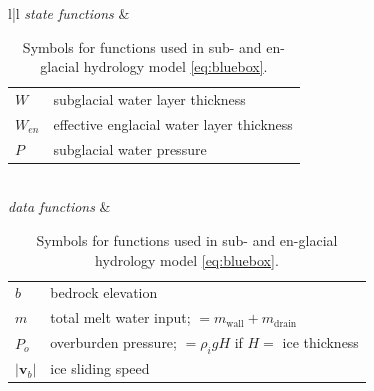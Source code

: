 \documentclass[11pt,final]{amsart}
\newcommand\bv{\mathbf{v}}
\begin{document}
\begin{table}[ht]
\caption{Symbols for functions used in sub- and en-glacial hydrology model \eqref{eq:bluebox}.}
\begin{tabular}{l|l}
\hline
\emph{state functions} & \begin{tabular}{ll}
        $W$ & subglacial water layer thickness \\
        $W_{en}$ & effective englacial water layer thickness \\
        $P$ & subglacial water pressure \\
        \end{tabular} \\ \hline
\emph{data functions} &  \begin{tabular}{ll}
        $b$ & bedrock elevation \\
        $m$ & total melt water input; $=m_{\text{wall}}+m_{\text{drain}}$ \\
        $P_o$ & overburden pressure; $= \rho_i g H$ if $H=$ ice thickness \\
        $|\bv_b|$ & ice sliding speed \\
        \end{tabular} \\ \hline
\end{tabular}
\label{tab:symbols}
\end{table}
\end{document}
